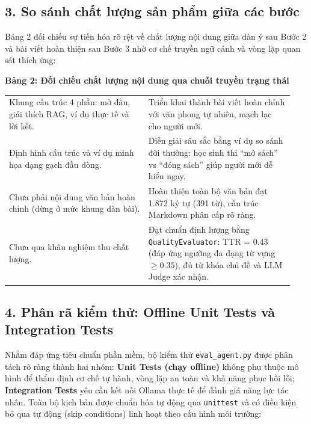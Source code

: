 \documentclass[]{article}
\newcommand{\thd}[1]{\cellcolor{primary}\textcolor{white}{\textbf{#1}}}
\begin{document}
\vspace{-2.5mm}
\subsection{3. So sánh chất lượng sản phẩm giữa các bước}
Bảng 2 đối chiếu sự tiến hóa rõ rệt về chất lượng nội dung giữa dàn ý sau Bước 2 và bài viết hoàn thiện sau Bước 3 nhờ cơ chế truyền ngữ cảnh và vòng lặp quan sát thích ứng:

\vspace{1.2mm}
\noindent\textbf{Bảng 2: Đối chiếu chất lượng nội dung qua chuỗi truyền trạng thái}\label{tab:so-sanh-chat-luong}

\vspace{5.0mm}
{\centering
\renewcommand{\arraystretch}{0.98}
\begin{tabular}{|p{0.46\linewidth}|p{0.48\linewidth}|}
\hline
\thd{\raggedright Sản phẩm sau Bước 2 (Dàn ý chi tiết)\strut} & \thd{\raggedright Sản phẩm sau Bước 3 (Bài viết hoàn thiện)\strut}\tabularnewline \hline
\raggedright Khung cấu trúc 4 phần: mở đầu, giải thích RAG, ví dụ thực tế và lời kết.\strut & \raggedright Triển khai thành bài viết hoàn chỉnh với văn phong tự nhiên, mạch lạc cho người mới.\strut \tabularnewline \hline
\raggedright Định hình cấu trúc và ví dụ minh họa dạng gạch đầu dòng.\strut & \raggedright Diễn giải sâu sắc bằng ví dụ so sánh đời thường: học sinh thi ``mở sách'' vs ``đóng sách'' giúp người mới dễ hiểu ngay.\strut \tabularnewline \hline
\raggedright Chưa phải nội dung văn bản hoàn chỉnh (dừng ở mức khung dàn bài).\strut & \raggedright Hoàn thiện toàn bộ văn bản đạt 1.872 ký tự (391 từ), cấu trúc Markdown phân cấp rõ ràng.\strut \tabularnewline \hline
\raggedright Chưa qua khâu nghiệm thu chất lượng.\strut & \raggedright Đạt chuẩn định lượng bằng \texttt{QualityEvaluator}: TTR = 0.43 (đáp ứng ngưỡng đa dạng từ vựng $\ge 0.35$), đủ từ khóa chủ đề và LLM Judge xác nhận.\strut \tabularnewline \hline
\end{tabular}\par}

\subsection{4. Phân rã kiểm thử: Offline Unit Tests và Integration Tests}
Nhằm đáp ứng tiêu chuẩn phần mềm, bộ kiểm thử \texttt{eval\_agent.py} được phân tách rõ ràng thành hai nhóm: \textbf{Unit Tests (chạy offline)} không phụ thuộc mô hình để thẩm định cơ chế tự hành, vòng lặp an toàn và khả năng phục hồi lỗi; \textbf{Integration Tests} yêu cầu kết nối Ollama thực tế để đánh giá năng lực tác nhân. Toàn bộ kịch bản được chuẩn hóa tự động qua \texttt{unittest} và có điều kiện bỏ qua tự động (skip conditions) linh hoạt theo cấu hình môi trường:
\end{document}
